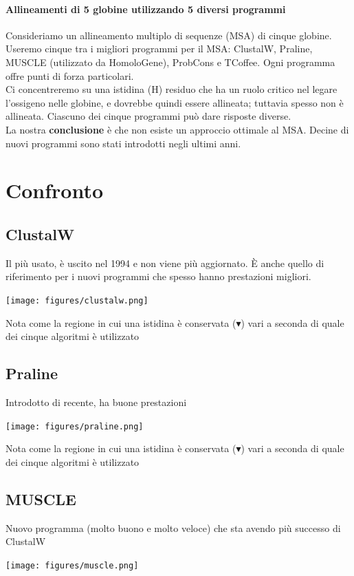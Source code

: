 \documentclass{article}
\begin{document}
\paragraph{Allineamenti di 5 globine utilizzando 5 diversi programmi}
Consideriamo un allineamento multiplo di sequenze (MSA) di
cinque globine. Useremo cinque tra i migliori programmi per il
MSA: ClustalW, Praline, MUSCLE (utilizzato da HomoloGene),
ProbCons e TCoffee. Ogni programma offre punti di forza
particolari.\\
Ci concentreremo su una istidina (H) residuo che ha un ruolo
critico nel legare l'ossigeno nelle globine, e dovrebbe quindi
essere allineata; tuttavia spesso non è allineata. Ciascuno dei
cinque programmi può dare risposte diverse.\\
La nostra \textbf{conclusione} è che non esiste un approccio ottimale
al MSA. Decine di nuovi programmi sono stati introdotti negli
ultimi anni.
\section{Confronto}
\subsection{ClustalW}
Il più usato, è uscito nel 1994 e non viene più aggiornato. È anche quello di
riferimento per i nuovi programmi che spesso hanno prestazioni migliori.
\begin{center}
    \texttt{[image: figures/clustalw.png]}
\end{center}
Nota come la regione in cui una istidina è conservata ($ \blacktriangledown $) vari a
seconda di quale dei cinque algoritmi è utilizzato
\subsection{Praline}
Introdotto di recente, ha buone prestazioni
\begin{center}
    \texttt{[image: figures/praline.png]}
\end{center}
Nota come la regione in cui una istidina è conservata ($ \blacktriangledown $) vari a
seconda di quale dei cinque algoritmi è utilizzato
\subsection{MUSCLE}
Nuovo programma (molto buono e molto veloce) che sta
avendo più successo di ClustalW
\begin{center}
    \texttt{[image: figures/muscle.png]}
\end{center}
\end{document}
